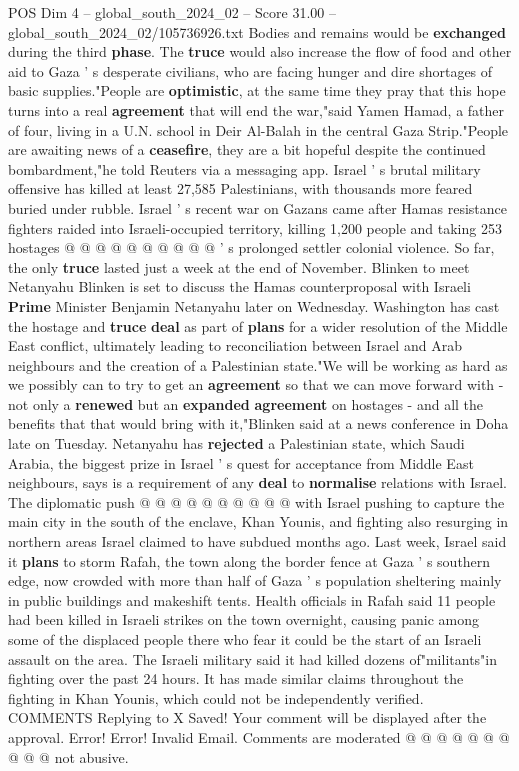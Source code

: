 \begin{textsample}{POS Dim 4 – global\_south\_2024\_02 – Score 31.00 – global\_south\_2024\_02/105736926.txt}
Bodies and remains would be \textbf{exchanged} during the third \textbf{phase}.
The \textbf{truce} would also increase the flow of food and other aid to Gaza ' s desperate civilians, who are facing hunger and dire shortages of basic supplies."People are \textbf{optimistic}, at the same time they pray that this hope turns into a real \textbf{agreement} that will end the war,"said Yamen Hamad, a father of four, living in a U.N. school in Deir Al-Balah in the central Gaza Strip."People are awaiting news of a \textbf{ceasefire}, they are a bit hopeful despite the continued bombardment,"he told Reuters via a messaging app.
Israel ' s brutal military offensive has killed at least 27,585 Palestinians, with thousands more feared buried under rubble.
Israel ' s recent war on Gazans came after Hamas resistance fighters raided into Israeli-occupied territory, killing 1,200 people and taking 253 hostages @ @ @ @ @ @ @ @ @ @ ' s prolonged settler colonial violence.
So far, the only \textbf{truce} lasted just a week at the end of November.
Blinken to meet Netanyahu Blinken is set to discuss the Hamas counterproposal with Israeli \textbf{Prime} Minister Benjamin Netanyahu later on Wednesday.
Washington has cast the hostage and \textbf{truce} \textbf{deal} as part of \textbf{plans} for a wider resolution of the Middle East conflict, ultimately leading to reconciliation between Israel and Arab neighbours and the creation of a Palestinian state."We will be working as hard as we possibly can to try to get an \textbf{agreement} so that we can move forward with - not only a \textbf{renewed} but an \textbf{expanded} \textbf{agreement} on hostages - and all the benefits that that would bring with it,"Blinken said at a news conference in Doha late on Tuesday.
Netanyahu has \textbf{rejected} a Palestinian state, which Saudi Arabia, the biggest prize in Israel ' s quest for acceptance from Middle East neighbours, says is a requirement of any \textbf{deal} to \textbf{normalise} relations with Israel.
The diplomatic push @ @ @ @ @ @ @ @ @ @ with Israel pushing to capture the main city in the south of the enclave, Khan Younis, and fighting also resurging in northern areas Israel claimed to have subdued months ago.
Last week, Israel said it \textbf{plans} to storm Rafah, the town along the border fence at Gaza ' s southern edge, now crowded with more than half of Gaza ' s population sheltering mainly in public buildings and makeshift tents.
Health officials in Rafah said 11 people had been killed in Israeli strikes on the town overnight, causing panic among some of the displaced people there who fear it could be the start of an Israeli assault on the area.
The Israeli military said it had killed dozens of"militants"in fighting over the past 24 hours.
It has made similar claims throughout the fighting in Khan Younis, which could not be independently verified.
COMMENTS Replying to X Saved!
Your comment will be displayed after the approval.
Error!
Error!
Invalid Email.
Comments are moderated @ @ @ @ @ @ @ @ @ @ not abusive.


\end{textsample}
